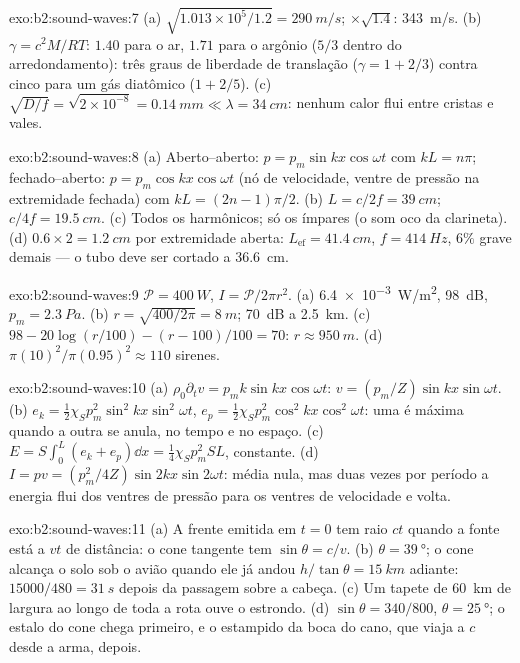 \begin{solution}{exo:b2:sound-waves:7}
(a) $\sqrt{1.013 \times 10^5/1.2} = \qty{290}{m/s}$; $\times\sqrt{1.4}$: \qty{343}{m/s}. (b)
$\gamma = c^2M/RT$: $1.40$ para o ar, $1.71$ para o argônio ($5/3$ dentro do arredondamento):
três graus de liberdade de translação ($\gamma = 1 + 2/3$) contra cinco para
um gás diatômico ($1 + 2/5$). (c) $\sqrt{D/f} = \sqrt{2 \times 10^{-8}} = \qty{0.14}{mm}
\ll \lambda = \qty{34}{cm}$: nenhum calor flui entre cristas e vales.
\end{solution}

\begin{solution}{exo:b2:sound-waves:8}
(a) Aberto--aberto: $p = p_m\sin kx\cos\omega t$ com $kL = n\pi$; fechado--aberto:
$p = p_m\cos kx\cos\omega t$ (nó de velocidade, ventre de pressão na extremidade
fechada) com $kL = (2n - 1)\pi/2$. (b) $L = c/2f = \qty{39}{cm}$; $c/4f = \qty{19.5}{cm}$.
(c) Todos os harmônicos; só os ímpares (o som oco da clarineta).
(d) $0.6 \times 2 = \qty{1.2}{cm}$ por extremidade aberta: $L_{\text{ef}} = \qty{41.4}{cm}$, $f =
\qty{414}{Hz}$, $6\%$ grave demais --- o tubo deve ser cortado a \qty{36.6}{cm}.
\end{solution}

\begin{solution}{exo:b2:sound-waves:9}
$\mathcal P = \qty{400}{W}$, $I = \mathcal P/2\pi r^2$. (a) \qty{6.4e-3}{W/m^2}, \qty{98}{dB},
$p_m = \qty{2.3}{Pa}$. (b) $r = \sqrt{400/2\pi} = \qty{8}{m}$; \qty{70}{dB} a \qty{2.5}{km}.
(c) $98 - 20\log(r/100) - (r - 100)/100 = 70$: $r \approx \qty{950}{m}$. (d)
$\pi(10)^2/\pi(0.95)^2 \approx 110$ sirenes.
\end{solution}

\begin{solution}{exo:b2:sound-waves:10}
(a) $\rho_0\partial_tv = p_mk\sin kx\cos\omega t$: $v = (p_m/Z)\sin kx\sin\omega t$. (b)
$e_k = \tfrac12\chi_Sp_m^2\sin^2kx\sin^2\omega t$, $e_p = \tfrac12\chi_Sp_m^2\cos^2kx\cos^2\omega t$:
uma é máxima quando a outra se anula, no tempo e no espaço. (c) $E =
S\int_0^L(e_k + e_p)\dd x = \tfrac14\chi_Sp_m^2SL$, constante. (d) $I = pv =
(p_m^2/4Z)\sin2kx\sin2\omega t$: média nula, mas duas vezes por período a energia
flui dos ventres de pressão para os ventres de velocidade e volta.
\end{solution}

\begin{solution}{exo:b2:sound-waves:11}
(a) A frente emitida em $t = 0$ tem raio $ct$ quando a fonte está a $vt$
de distância: o cone tangente tem $\sin\theta = c/v$. (b) $\theta = \qty{39}{\degree}$; o cone
alcança o solo sob o avião quando ele já andou $h/\tan\theta = \qty{15}{km}$
adiante: $15000/480 = \qty{31}{s}$ depois da passagem sobre a cabeça. (c) Um
tapete de \qty{60}{km} de largura ao longo de toda a rota ouve o estrondo. (d) $\sin\theta
= 340/800$, $\theta = \qty{25}{\degree}$; o estalo do cone chega primeiro, e o
estampido da boca do cano, que viaja a $c$ desde a arma, depois.
\end{solution}

